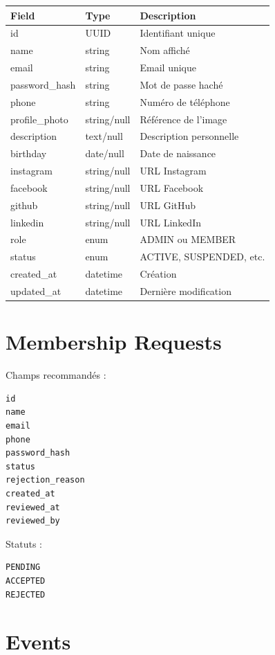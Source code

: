 \documentclass[11pt,a4paper]{report}
\begin{document}
\begin{longtable}{p{}p{}p{}}
\toprule
\textbf{Field} & \textbf{Type} & \textbf{Description}\\
\midrule
id & UUID & Identifiant unique\\
name & string & Nom affiché\\
email & string & Email unique\\
password\_hash & string & Mot de passe haché\\
phone & string & Numéro de téléphone\\
profile\_photo & string/null & Référence de l'image\\
description & text/null & Description personnelle\\
birthday & date/null & Date de naissance\\
instagram & string/null & URL Instagram\\
facebook & string/null & URL Facebook\\
github & string/null & URL GitHub\\
linkedin & string/null & URL LinkedIn\\
role & enum & ADMIN ou MEMBER\\
status & enum & ACTIVE, SUSPENDED, etc.\\
created\_at & datetime & Création\\
updated\_at & datetime & Dernière modification\\
\bottomrule
\end{longtable}

\section{Membership Requests}

Champs recommandés :

\begin{lstlisting}
id
name
email
phone
password_hash
status
rejection_reason
created_at
reviewed_at
reviewed_by
\end{lstlisting}

Statuts :

\begin{lstlisting}
PENDING
ACCEPTED
REJECTED
\end{lstlisting}

\section{Events}
\end{document}
